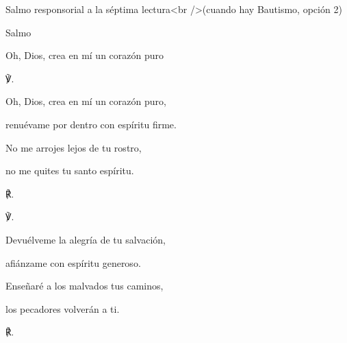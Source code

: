 			\begin{readbook}Salmo responsorial a la séptima lectura<br />(cuando hay Bautismo, opción 2)\end{readbook}
			
			\begin{readbook}Salmo \end{readbook}
			
			\begin{readtheme}Oh, Dios, crea en mí un corazón puro\end{readtheme}
			
			\begin{readbody}\begin{readred}℣.\end{readred} Oh, Dios, crea en mí un corazón puro, \end{readbody}
			
			\begin{readtabbed}renuévame por dentro con espíritu firme. \end{readtabbed}
			
			\begin{readtabbed}No me arrojes lejos de tu rostro, \end{readtabbed}
			
			\begin{readtabbed}no me quites tu santo espíritu. \begin{readred}℟.\end{readred}\end{readtabbed}
			
			\begin{readbody}\begin{readred}℣.\end{readred} Devuélveme la alegría de tu salvación, \end{readbody}
			
			\begin{readtabbed}afiánzame con espíritu generoso. \end{readtabbed}
			
			\begin{readtabbed}Enseñaré a los malvados tus caminos, \end{readtabbed}
			
			\begin{readtabbed}los pecadores volverán a ti. \begin{readred}℟.\end{readred}\end{readtabbed}
			
